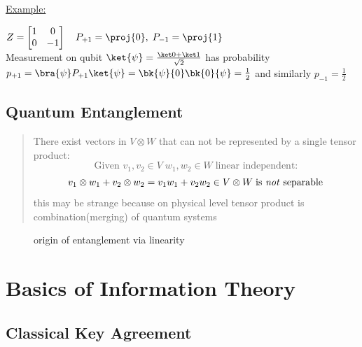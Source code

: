 			\quad\underline{Example:}\\
			\begin{center}
				$ Z = \begin{bmatrix} 1 & 0 \\ 0 & -1 \end{bmatrix} \quad P_{+1} = \proj{0} , \; P_{-1} = \proj{1}	 $\\
				Measurement on qubit $ \ket{\psi} = \frac{\ket0 + \ket1}{\sqrt{2}} $ has probability $p_{+1} = \bra{\psi}P_{+1}\ket{\psi} = \bk{\psi}{0}\bk{0}{\psi} = \frac{1}{2}$ and similarly $p_{-1} = \frac{1}{2}$
				\cite{NC10}
			\end{center}%

		\subsection{Quantum Entanglement}
		\begin{quotation}
		There exist vectors in $V\otimes W$ that can not be represented by a single tensor product:
		$$ \textrm{Given } v_1,v_2\in V \; w_1,w_2\in W \; \textrm{linear independent:}$$
		$$v_1\otimes w_1 + v_2\otimes w_2 = v_1w_1 + v_2w_2 \in V\otimes W \; \textrm{is \emph{not} separable}$$ 
		this may be strange because on physical level tensor product is combination(merging) of quantum systems
		\cite{Han13}
		\end{quotation}
		
		\begin{figure}[h]
			\centering
			
			\caption{origin of entanglement via linearity}
		\end{figure}
		
	\section{Basics of Information Theory}
		\subsection{Classical Key Agreement}
